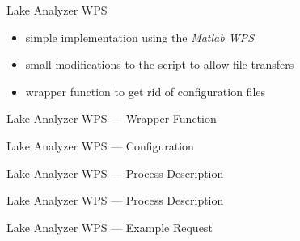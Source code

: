 \documentclass[xcolor=svgnames,professionalfonts,11pt,aspectratio=43]{beamer}
\begin{document}

\begin{frame}[t]{Lake Analyzer WPS}
  \begin{itemize}
    \item simple implementation using the \emph{Matlab WPS}
    \pause
    \item small modifications to the script to allow file transfers
    \pause
    \item wrapper function to get rid of configuration files
  \end{itemize}
\end{frame}

\begin{frame}[c,fragile]{Lake Analyzer WPS --- Wrapper Function}
    \begin{center}
      
    \end{center}
\end{frame}

\begin{frame}[c,fragile]{Lake Analyzer WPS --- Configuration}
    \begin{center}
      
    \end{center}
\end{frame}

\begin{frame}[c,fragile]{Lake Analyzer WPS --- Process Description}
    \begin{center}
      
    \end{center}
\end{frame}

\begin{frame}[c,fragile]{Lake Analyzer WPS --- Process Description}
    \begin{center}
      
    \end{center}
\end{frame}

\begin{frame}[c,fragile]{Lake Analyzer WPS --- Example Request}
    \begin{center}
      
    \end{center}
\end{frame}
\end{document}

